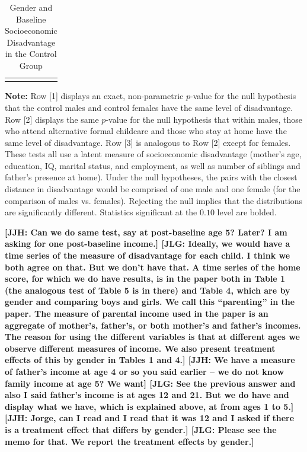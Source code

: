 \begin{table}[!htpb]
\begin{threeparttable}
\caption{Gender and Baseline Socioeconomic Disadvantage in the Control Group} \label{table:disadtests}
\centering
\begin{tabularx}{16.5cm}{XcX}
&  &
\end{tabularx}
\begin{tablenotes}
\footnotesize
\item \textbf{Note:} Row [1] displays an exact, non-parametric $p$-value for the null hypothesis that the control males and control females have the same level of disadvantage. Row [2] displays the same $p$-value for the null  hypothesis that within males, those who attend alternative formal childcare and those who stay at home have the same level of disadvantage. Row [3] is analogous to Row [2] except for females. These tests all use a latent measure of socioeconomic disadvantage (mother's age, education, IQ, marital status, and employment, as well as number of siblings and father's presence at home). Under the null hypotheses, the pairs with the closest distance in disadvantage would be comprised of one male and one female (for the comparison of males vs. females). Rejecting the null implies that the distributions are significantly different. Statistics significant at the $0.10$ level are bolded.
\end{tablenotes}
\end{threeparttable}
\textbf{[JJH: Can we do same test, say at post-baseline age 5? Later? I am asking for one post-baseline income.] [JLG: Ideally, we would have a time series of the measure of disadvantage for each child. I think we both agree on that. But we don't have that. A time series of the home score, for which we do have results, is in the paper both in Table 1 (the analogous test of Table 5 is in there) and Table 4, which are by gender and comparing boys and girls. We call this ``parenting'' in the paper. The measure of parental income used in the paper is an aggregate of mother's, father's, or both mother's and father's incomes. The reason for using the different variables is that at different ages we observe different measures of income. We also present treatment effects of this by gender in Tables 1 and 4.] [JJH: We have a measure of father's income at age 4 or so you said earlier -- we do not know family income at age 5? We want] [JLG: See the previous answer and also I said father's income is at ages 12 and 21. But we do have and display what we have, which is explained above, at from ages 1 to 5.] [JJH: Jorge, can I read and I read that it was 12 and I asked if there is a treatment effect that differs by gender.] [JLG: Please see the memo for that. We report the treatment effects by gender.]
}
\end{table}

